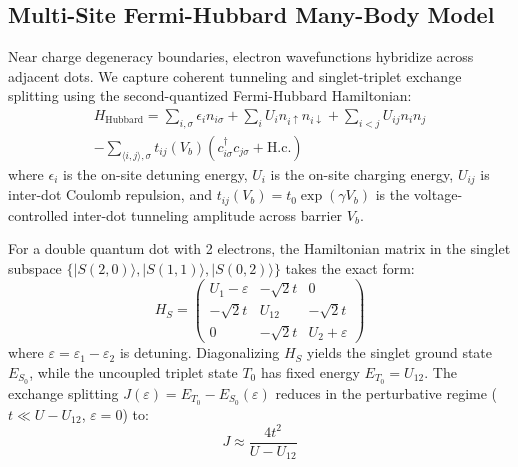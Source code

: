 \documentclass[journal,twocolumn,10pt]{IEEEtran}
\begin{document}
\subsection{Multi-Site Fermi-Hubbard Many-Body Model}
Near charge degeneracy boundaries, electron wavefunctions hybridize across adjacent dots. We capture coherent tunneling and singlet-triplet exchange splitting using the second-quantized Fermi-Hubbard Hamiltonian:
\begin{align}
H_{\text{Hubbard}} = \sum_{i, \sigma} \epsilon_i n_{i\sigma} + \sum_i U_i n_{i\uparrow} n_{i\downarrow} + \sum_{i < j} U_{ij} n_i n_j \nonumber \\
- \sum_{\langle i, j \rangle, \sigma} t_{ij}(V_b) \left( c_{i\sigma}^\dagger c_{j\sigma} + \text{H.c.} \right)
\end{align}
where $\epsilon_i$ is the on-site detuning energy, $U_i$ is the on-site charging energy, $U_{ij}$ is inter-dot Coulomb repulsion, and $t_{ij}(V_b) = t_0 \exp(\gamma V_b)$ is the voltage-controlled inter-dot tunneling amplitude across barrier $V_b$.

For a double quantum dot with 2 electrons, the Hamiltonian matrix in the singlet subspace $\{|S(2,0)\rangle, |S(1,1)\rangle, |S(0,2)\rangle\}$ takes the exact form:
\begin{equation}
H_S = \begin{pmatrix} 
U_1 - \varepsilon & -\sqrt{2}t & 0 \\ 
-\sqrt{2}t & U_{12} & -\sqrt{2}t \\ 
0 & -\sqrt{2}t & U_2 + \varepsilon 
\end{pmatrix}
\end{equation}
where $\varepsilon = \varepsilon_1 - \varepsilon_2$ is detuning. Diagonalizing $H_S$ yields the singlet ground state $E_{S_0}$, while the uncoupled triplet state $T_0$ has fixed energy $E_{T_0} = U_{12}$. The exchange splitting $J(\varepsilon) = E_{T_0} - E_{S_0}(\varepsilon)$ reduces in the perturbative regime ($t \ll U - U_{12}$, $\varepsilon=0$) to:
\begin{equation}
J \approx \frac{4 t^2}{U - U_{12}}
\end{equation}
\end{document}
